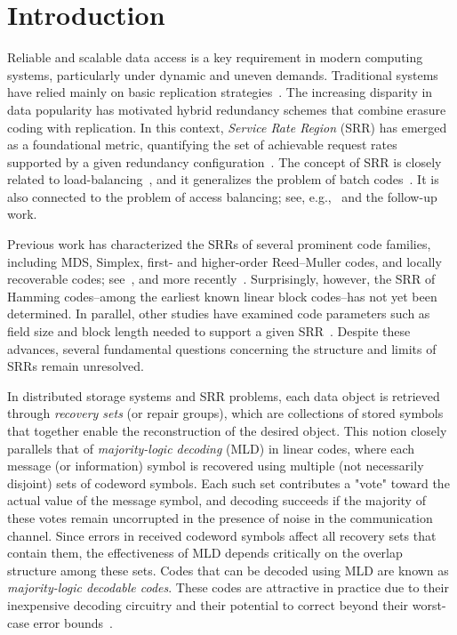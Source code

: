 \documentclass[conference,letterpaper]{IEEEtran}
\begin{document}
\section{Introduction}\label{intro}
Reliable and scalable data access is a key requirement in modern computing systems, particularly under dynamic and uneven demands. Traditional systems have relied mainly on basic replication strategies~\cite{SRR:journals/tit/AktasJKKS21}. The increasing disparity in data popularity has motivated hybrid redundancy schemes that combine erasure coding with replication. In this context, \emph{Service Rate Region} (SRR) has emerged as a foundational metric, quantifying the set of achievable request rates supported by a given redundancy configuration~\cite{SRR:journals/tit/AktasJKKS21,SRR:conf/isit/KazemiKS20}. The concept of SRR is closely related to load-balancing~\cite{LB:AktasFSW21}, and it generalizes the problem of batch codes~\cite{SRR:conf/isit/KazemiKSS20}. It is also connected to the problem of access balancing; see, e.g.,~\cite{MaxMinSum:DauM'18} and the follow-up work.

Previous work has characterized the SRRs of several prominent code families, including MDS, Simplex, first- and higher-order Reed–Muller codes, and locally recoverable codes; see~\cite{SRR:journals/tit/AktasJKKS21}, and more recently~\cite{SRR:lySV2025,SRR:preprint/arxiv/LySL25}. Surprisingly, however, the SRR of Hamming codes--among the earliest known linear block codes--has not yet been determined. In parallel, other studies have examined code parameters such as field size and block length needed to support a given SRR~\cite{CodeParameters:conf/isit/KilicRS24}. Despite these advances, several fundamental questions concerning the structure and limits of SRRs remain unresolved.

In distributed storage systems and SRR problems, each data object is retrieved through \emph{recovery sets} (or repair groups), which are collections of stored symbols that together enable the reconstruction of the desired object. This notion closely parallels that of \emph{majority-logic decoding} (MLD) in linear codes, where each message (or information) symbol is recovered using multiple (not necessarily disjoint) sets of codeword symbols. Each such set contributes a "vote" toward the actual value of the message symbol, and decoding succeeds if the majority of these votes remain uncorrupted in the presence of noise in the communication channel. Since errors in received codeword symbols affect all recovery sets that contain them, the effectiveness of MLD depends critically on the overlap structure among these sets. Codes that can be decoded using MLD are known as \emph{majority-logic decodable codes}. These codes are attractive in practice due to their inexpensive decoding circuitry and their potential to correct beyond their worst-case error bounds~\cite{Coding:books/PetersonW72}. 
\end{document}
